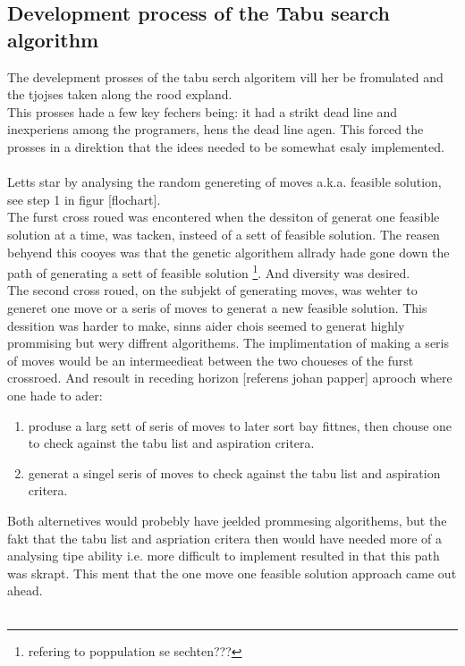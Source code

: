 \subsection{Development process of the Tabu search algorithm}

The develepment prosses of the tabu serch algoritem vill her be fromulated and the tjojses taken along the rood expland.\\
This prosses hade a few key fechers being: it had a strikt dead line and inexperiens among the programers, hens the dead line agen. This forced the prosses in a direktion that the idees needed to be somewhat esaly implemented. \\
\\
Letts star by analysing the random genereting of moves a.k.a. feasible solution, see step 1 in figur [flochart].\\
The furst cross roued was encontered when the dessiton of generat one feasible solution at a time, was tacken, insteed of a sett of feasible solution. The reasen behyend this cooyes was that the genetic algorithem allrady hade gone down the path of generating a sett of feasible solution \footnote{ refering to poppulation se sechten???}. And diversity was desired.\\
The second cross roued, on the subjekt of generating moves, was wehter to generet one move or a seris of moves to generat a new feasible solution. This dessition was harder to make, sinns aider chois seemed to generat highly prommising but wery diffrent algorithems. The implimentation of making a seris of moves would be an intermeedieat between the two choueses of the furst crossroed. And resoult in receding horizon [referens johan papper] aprooch where one hade to ader:
\begin{enumerate}
\item produse a larg sett of seris of moves to later sort bay fittnes, then chouse one to check against the tabu list and aspiration critera.
\item generat a singel seris of moves to check against the tabu list and aspiration critera.
\end{enumerate}
Both alternetives would probebly have jeelded prommesing algorithems, but the fakt that the tabu list and aspriation critera then would have needed more of a analysing tipe ability i.e. more difficult to implement resulted in that this path was skrapt. This ment that the one move one feasible solution approach came out ahead.\\
\\
